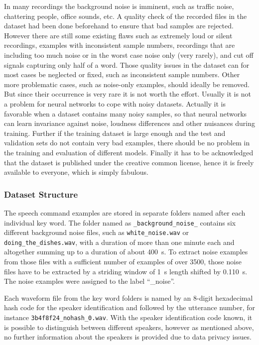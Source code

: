 In many recordings the background noise is imminent, such as traffic noise, chattering people, office sounds, etc.
A quality check of the recorded files in the dataset had been done beforehand to ensure that bad samples are rejected.
However there are still some existing flaws such as extremely loud or silent recordings, examples with inconsistent sample numbers, recordings that are including too much noise or in the worst case noise only (very rarely), and cut off signals capturing only half of a word.
Those quality issues in the dataset can for most cases be neglected or fixed, such as inconsistent sample numbers. 
Other more problematic cases, such as noise-only examples, should ideally be removed.
But since their occurrence is very rare it is not worth the effort.
Usually it is not a problem for neural networks to cope with noisy datasets. 
Actually it is favorable when a dataset contains many noisy samples, so that neural networks can learn invariance against noise, loudness differences and other nuisances during training.
Further if the training dataset is large enough and the test and validation sets do not contain very bad examples, there should be no problem in the training and evaluation of different models.
Finally it has to be acknowledged that the dataset is published under the creative common license, hence it is freely available to everyone, which is simply fabulous.



\subsubsection{Dataset Structure}\label{sec:exp_dataset_structure}
The speech command examples are stored in separate folders named after each individual key word.
The folder named as \texttt{\_background\_noise\_} contains six different background noise files, such as \texttt{white\_noise.wav} or \texttt{doing\_the\_dishes.wav}, with a duration of more than one minute each and altogether summing up to a duration of about \SI{400}{s}.
To extract noise examples from those files with a sufficient number of examples of over 3500, those noise files have to be extracted by a striding window of \SI{1}{\second} length shifted by \SI{0.110}{\second}.
The noise examples were assigned to the label \enquote{\_noise}.

Each waveform file from the key word folders is named by an 8-digit hexadecimal hash code for the speaker identification and followed by the utterance number, for instance \texttt{3b4f8f24\_nohash\_0.wav}.
With the speaker identification code known, it is possible to distinguish between different speakers, however as mentioned above, no further information about the speakers is provided due to data privacy issues.

